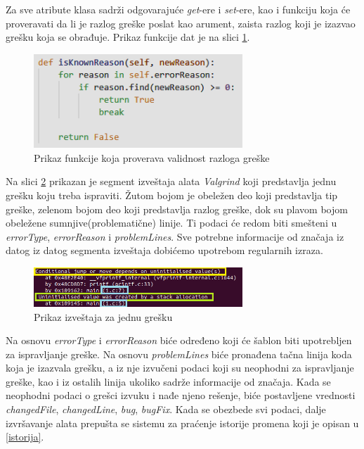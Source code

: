 \documentclass[12pt,oneside]{memoir}
\theoremstyle{plain}
\theoremstyle{definition}
\begin{document}
Za sve atribute klasa sadrži odgovarajuće \textit{get}-ere i \textit{set}-ere, kao i funkciju koja će proveravati da li je razlog greške poslat kao arument, zaista razlog koji je izazvao grešku koja se obrađuje. Prikaz funkcije dat je na slici \ref{fig:slika4.2}.
\begin{figure}[!ht]
  \centering
  \includegraphics[width=0.7\textwidth]{ErrorReason.png}
  \caption{Prikaz funkcije koja proverava validnost razloga greške}
  \label{fig:slika4.2}
\end{figure}

Na slici \ref{fig:slika4.3} prikazan je segment izveštaja alata \textit{Valgrind} koji predstavlja jednu grešku koju treba ispraviti. Žutom bojom je obeležen deo koji predstavlja tip greške, zelenom bojom deo koji predstavlja razlog greške, dok su plavom bojom obeležene sumnjive(problematične) linije. Ti podaci će redom biti smešteni u \textit{errorType}, \textit{errorReason} i \textit{problemLines}. Sve potrebne informacije od značaja iz datog iz datog segmenta izveštaja dobićemo upotrebom regularnih izraza.

\begin{figure}[!ht]
  \centering
  \includegraphics[width=0.7\textwidth]{ErrorClassExplaination.png}
  \caption{Prikaz izveštaja za jednu grešku}
  \label{fig:slika4.3}
\end{figure}

Na osnovu \textit{errorType} i \textit{errorReason} biće određeno koji će šablon biti upotrebljen za ispravljanje greške. Na osnovu \textit{problemLines} biće pronađena tačna linija koda koja je izazvala grešku, a iz nje izvučeni podaci koji su neophodni za ispravljanje greške, kao i iz ostalih linija ukoliko sadrže informacije od značaja. Kada se neophodni podaci o grešci izvuku i nađe njeno rešenje, biće postavljene vrednosti \textit{changedFile}, \textit{changedLine}, \textit{bug}, \textit{bugFix}. Kada se obezbede svi podaci, dalje izvršavanje alata prepušta se sistemu za praćenje istorije promena koji je opisan u \ref{istorija}.
\end{document}
